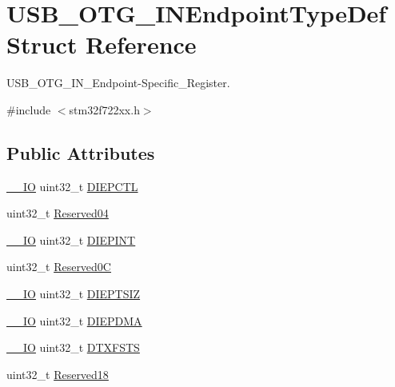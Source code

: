 \hypertarget{struct_u_s_b___o_t_g___i_n_endpoint_type_def}{}\section{U\+S\+B\+\_\+\+O\+T\+G\+\_\+\+I\+N\+Endpoint\+Type\+Def Struct Reference}
\label{struct_u_s_b___o_t_g___i_n_endpoint_type_def}


U\+S\+B\+\_\+\+O\+T\+G\+\_\+\+I\+N\+\_\+\+Endpoint-\/\+Specific\+\_\+\+Register.  




{\ttfamily \#include $<$stm32f722xx.\+h$>$}

\subsection*{Public Attributes}
\begin{DoxyCompactItemize}
\item 
\mbox{\hyperlink{core__sc300_8h_aec43007d9998a0a0e01faede4133d6be}{\+\_\+\+\_\+\+IO}} uint32\+\_\+t \mbox{\hyperlink{struct_u_s_b___o_t_g___i_n_endpoint_type_def_a7ae9a62fb2acdc8981930ceb8ba5f100}{D\+I\+E\+P\+C\+TL}}
\item 
uint32\+\_\+t \mbox{\hyperlink{struct_u_s_b___o_t_g___i_n_endpoint_type_def_ab40b947e437eea142bb6682282b073d6}{Reserved04}}
\item 
\mbox{\hyperlink{core__sc300_8h_aec43007d9998a0a0e01faede4133d6be}{\+\_\+\+\_\+\+IO}} uint32\+\_\+t \mbox{\hyperlink{struct_u_s_b___o_t_g___i_n_endpoint_type_def_af66b4da67fb3732d6fd4f98dd0e9f824}{D\+I\+E\+P\+I\+NT}}
\item 
uint32\+\_\+t \mbox{\hyperlink{struct_u_s_b___o_t_g___i_n_endpoint_type_def_a30c3ab77aa3174965375dfe1a01bdddb}{Reserved0C}}
\item 
\mbox{\hyperlink{core__sc300_8h_aec43007d9998a0a0e01faede4133d6be}{\+\_\+\+\_\+\+IO}} uint32\+\_\+t \mbox{\hyperlink{struct_u_s_b___o_t_g___i_n_endpoint_type_def_aeda9700dcd52e252d7809cabed971bab}{D\+I\+E\+P\+T\+S\+IZ}}
\item 
\mbox{\hyperlink{core__sc300_8h_aec43007d9998a0a0e01faede4133d6be}{\+\_\+\+\_\+\+IO}} uint32\+\_\+t \mbox{\hyperlink{struct_u_s_b___o_t_g___i_n_endpoint_type_def_a8a7731263a0403b02e369ca387dce8e0}{D\+I\+E\+P\+D\+MA}}
\item 
\mbox{\hyperlink{core__sc300_8h_aec43007d9998a0a0e01faede4133d6be}{\+\_\+\+\_\+\+IO}} uint32\+\_\+t \mbox{\hyperlink{struct_u_s_b___o_t_g___i_n_endpoint_type_def_a2343fef0358d8713918d26eb93f1fa8b}{D\+T\+X\+F\+S\+TS}}
\item 
uint32\+\_\+t \mbox{\hyperlink{struct_u_s_b___o_t_g___i_n_endpoint_type_def_a525d6997cba563967fd7ea22898ed4f6}{Reserved18}}
\end{DoxyCompactItemize}


